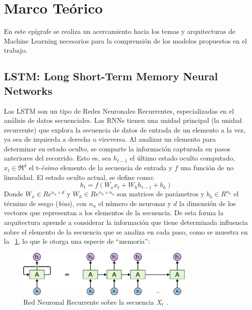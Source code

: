 \section{Marco Teórico}

En este epígrafe se realiza un acercamiento hacia los temas y arquitecturas de Machine Learning necesarios para la comprensión de los modelos propuestos en el trabajo.

\subsection{LSTM: Long Short-Term Memory Neural Networks}

	Las LSTM son un tipo de Redes Neuronales Recurrentes, especializadas en el análisis de datos secuenciales. 
	Las RNNs tienen una unidad principal (la unidad recurrente) que explora la secuencia de datos de entrada de un elemento a la vez, ya sea de izquierda a derecha o viceversa. Al analizar un elemento para determinar su estado oculto, se comparte la información capturada en pasos anteriores del recorrido. Esto es, sea $h_{t-1}$ el último estado oculto computado, $x_t \in \Re^d$ el t-\textit{\'{e}simo} elemento de la secuencia de entrada y $f$ una función de no linealidad. El estado oculto actual, se define como:
	\begin{equation}
		h_t = f(W_xx_t + W_hh_{t-1} + b_h)
		\label{rrn_form}
	\end{equation}
	Donde $W_x \in Re^{n_u\times d}$ y $W_h \in Re^{n_u\times n_u}$ son matrices de parámetros y $b_h \in R^{n_u}$ el término de sesgo (\textit{bias}), con $n_u$ el número de neuronas y $d$ la dimensión de los vectores que representan a los elementos de la secuencia.
	De esta forma la arquitectura aprende a considerar la información que tiene determinada influencia sobre el elemento de la secuencia que se analiza en cada paso, como se muestra en la \figurename~\ref{rnn}, lo que le otorga una especie de ``memoria'':
	\begin{figure}[!thb]
		\begin{center}
			\includegraphics[width=250pt]{images/rnn.png}
		\end{center}
		\caption[Red Neuronal Recurrente]{Red Neuronal Recurrente sobre la secuencia $X_t$ \citep{agarwala2017music}.}
		\label{rnn}
	\end{figure}
